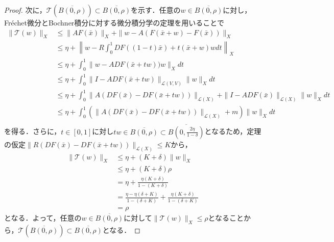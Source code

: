 \begin{proof}
  次に，$\mathcal{T}(\overline{B(0,\rho)}) \subset \overline{B(0,\rho)}$を示す．任意の$w\in \overline{B(0,\rho)}$に対し，Fr\'{e}chet微分とBochner積分に対する微分積分学の定理を用いることで
  \begin{align*}
    \|\mathcal{T}(w)\|_X & \leq \|AF(\bar{x})\|_X + \|w-A(F(\bar{x}+w)-F(\bar{x}))\|_X                                                             \\
                         & \leq \eta + \left\| w - R\int_0^1 DF((1-t)\bar{x})+t(\bar{x}+w)wdt \right\|_X                                                        \\
                         & \leq \eta + \int_0^1 \|w - ADF(\bar{x}+tw))w\|_X dt                                                                     \\
                         & \leq \eta + \int_0^1 \|I - ADF(\bar{x}+tw)\|_{\mathcal{L}(V,V)}\|w\|_X dt                                               \\
                         & \leq \eta + \int_0^1 \|A(DF(\bar{x})-DF(\bar{x}+tw))\|_{\mathcal{L}(X)} + \|I-ADF(\bar{x})\|_{\mathcal{L}(X)}\|w\|_X dt \\
                         & \leq \eta + \int_0^1 (\|A(DF(\bar{x})-DF(\bar{x}+tw))\|_{\mathcal{L}(X)} +m) \|w\|_{X}dt                                \\
  \end{align*}
  を得る．さらに，$t\in[0,1]$に対し$tw\in\overline{B(0,\rho)}\subset\overline{B\left(0,\frac{2\eta}{1-\delta}\right)}$となるため，定理の仮定$\|R(DF(\bar{x})-DF(\bar{x}+tw))\|_{\mathcal{L}(X)}\leq K$から，
  \begin{align*}
    \|\mathcal{T}(w)\|_X & \leq \eta + (K+\delta)\|w\|_X                                             \\
                         & \leq \eta + (K+\delta)\rho                                                \\
                         & = \eta + \frac{\eta(K+\delta)}{1-(K+\delta)}                              \\
                         & = \frac{\eta-\eta(\delta+K)}{1-(\delta+K)}+\frac{\eta(K+\delta)}{1-(\delta+K)} \\
                         & = \rho
  \end{align*}
  となる．よって，任意の$w\in \overline{B(0,\rho)}$に対して$\|\mathcal{T}(w)\|_X \leq \rho$となることから，$\mathcal{T}\left(\overline{B(0,\rho)}\right) \subset \overline{B(0,\rho)}$となる．


\end{proof}
